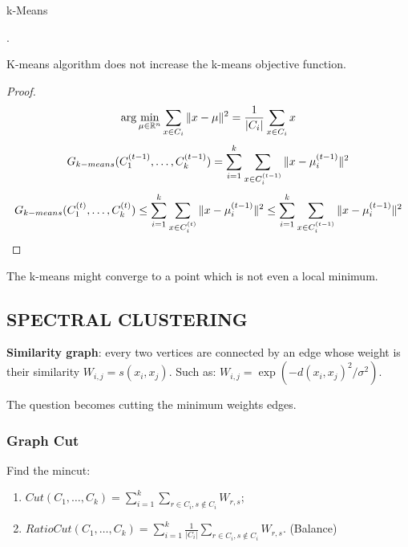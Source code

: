 \begin{algorithm}[H]
    \caption{k-Means}
    \begin{algorithmic}
        \EndWhile.
    \end{algorithmic}
\end{algorithm}

\begin{lemma}
    {K-means} algorithm does not increase the {k-means} objective function.
    \begin{proof}
        \[
            \arg\min_{\mu \in \mathbb{R}^n} \sum^{}_{x \in C_i} \Arrowvert x - \mu \Arrowvert^2 = \frac{1}{\left| C_i \right|} \sum^{}_{x \in C_i} x 
        \]
        \[
            G_{k-means}(C^{(t-1)}_1, \ldots, C^{(t-1)}_k) = \sum^{k}_{i=1} \sum^{}_{x \in C^{(t-1)}_{i}} \Arrowvert x - \mu^{(t-1)}_i \Arrowvert^2 
        \]
        \[
            G_{k-means}(C^{(t)}_1, \ldots, C^{(t)}_{k}) \le \sum^{k}_{i=1} \sum^{}_{x \in C^{(t)}_{i}} \Arrowvert x - \mu^{(t-1)}_i \Arrowvert^2 \le \sum^{k}_{i=1} \sum^{}_{x \in C^{(t-1)}_{i}} \Arrowvert x - \mu^{(t-1)}_i \Arrowvert^2 
        \]
    \end{proof}
\end{lemma}

The k-means might converge to a point which is not even a local minimum.

\subsection{SPECTRAL CLUSTERING}%

\textbf{Similarity graph}: every two vertices are connected by an edge whose weight is their similarity $ W_{i,j} = s(x_i, x_j) $. Such as: $ W_{i,j} = \exp(-{d(x_i, x_j)}^2 / \sigma^2) $.

The question becomes cutting the minimum weights edges.

\subsubsection{Graph Cut}%

Find the mincut:
\begin{enumerate}
    \item $ Cut(C_1, \ldots, C_k) = \sum^{k}_{i=1} \sum^{}_{r \in C_i, s \notin C_i} W_{r,s} $;
    \item $ RatioCut(C_1, \ldots, C_k) = \sum^{k}_{i=1} \frac{1}{\left| C_i \right|} \sum^{}_{r \in C_i, s \notin C_i} W_{r,s} $. (Balance)
\end{enumerate}

